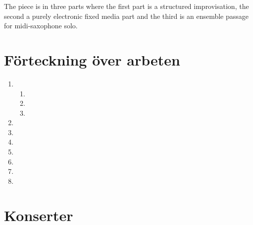 \documentclass[a4paper]{article}
\begin{document}
The piece is in three parts where the first part is a structured improvisation, the second a purely electronic fixed media part and the third is an ensemble passage for midi-saxophone solo. 


\clearpage
\section{Förteckning över arbeten}

\begin{enumerate}
\item {}
  \begin{enumerate}
  \item {}
  \item {}
  \item {}
  \end{enumerate}
\item {}
\item {}
\item {}
\item {}
\item {}
\item {}
\item {}
\end{enumerate}

\clearpage

\section{Konserter}
\end{document}
